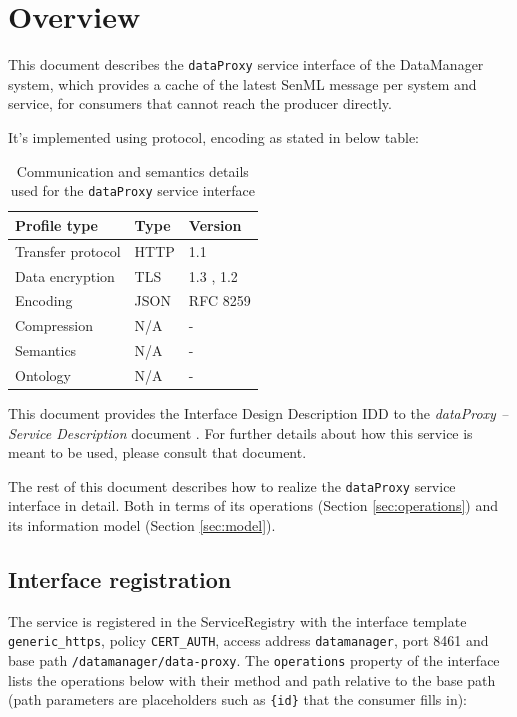\documentclass[a4paper]{arrowhead}
\begin{document}
\section{Overview}
\label{sec:overview}

This document describes the \texttt{dataProxy} service interface of the DataManager system, which provides a cache of the latest SenML message per system and service, for consumers that cannot reach the producer directly.

It's implemented using protocol, encoding as stated in below table:
\begin{table}[ht!]
  \centering
  \begin{tabular}{|l|l|l|}
    \hline
    \rowcolor{gray!33} Profile type & Type & Version \\ \hline
    Transfer protocol & HTTP & 1.1 \cite{rfc9112} \\ \hline
    Data encryption & TLS & 1.3 \cite{rfc8446}, 1.2 \cite{rfc5246} \\ \hline
    Encoding & JSON & RFC 8259 \cite{rfc8259} \\ \hline
    Compression & N/A & - \\ \hline
    Semantics & N/A & - \\ \hline
    Ontology & N/A & - \\ \hline
  \end{tabular}
  \caption{Communication and semantics details used for the \texttt{dataProxy} service interface}
  \label{tab:comunication_semantics_profile}
\end{table}

This document provides the Interface Design Description IDD to the \textit{dataProxy -- Service Description} document \cite{dm-dataProxy-sd}.
For further details about how this service is meant to be used, please consult that document.

The rest of this document describes how to realize the \texttt{dataProxy} service
interface in detail. Both in terms of its operations (Section \ref{sec:operations}) and its information model (Section \ref{sec:model}).

\subsection{Interface registration}

The service is registered in the ServiceRegistry with the interface template \texttt{generic\_\allowbreak{}https}, policy \texttt{CERT\_\allowbreak{}AUTH}, access address \texttt{datamanager}, port 8461 and base path \texttt{/\allowbreak{}datamanager/\allowbreak{}data-\allowbreak{}proxy}. The \texttt{operations} property of the interface lists the operations below with their method and path relative to the base path (path parameters are placeholders such as \texttt{\{id\}} that the consumer fills in):
\end{document}
